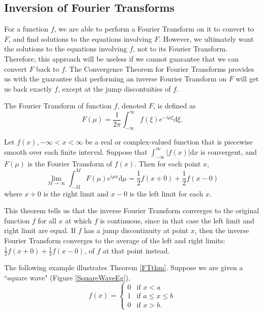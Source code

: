\subsection{Inversion of Fourier Transforms}
For a function $f$, we are able to perform a Fourier Transform on it to convert to $F$, and find solutions to the equations involving $F$.
However, we ultimately want the solutions to the equations involving $f$, not to its Fourier Transform.
Therefore, this approach will be useless if we cannot guarantee that we can convert $F$ back to $f$.
The Convergence Theorem for Fourier Transforms provides us with the guarantee that performing an inverse Fourier Transform on $F$ will get us back exactly $f$, except at the jump discontuities of $f$.

\begin{defn} \label{FTdefn}
The Fourier Transform of function $f$, denoted $F$, is defined as
$$F(\mu) = \frac{1}{2\pi}\int_{-\infty}^{\infty}f(\xi)e^{-i\mu\xi}\mathrm{d}\xi.$$
\end{defn}

\begin{thm} \label{FTthm}
Let $f(x), -\infty < x < \infty$ be a real or complex-valued function that is piecewise smooth over each finite interval. \pause Suppose that $\int_{-\infty}^{\infty}|f(x)|\mathrm{d}x$ is convergent, and $F(\mu)$ is the Fourier Transform of $f(x)$. \pause Then for each point $x$,
$$\lim_{M\rightarrow\infty}\int_{-M}^{M} F(\mu)e^{i\mu x}\mathrm{d}\mu = \frac{1}{2}f(x+0) + \frac{1}{2}f(x-0)$$
where $x+0$ is the right limit and $x-0$ is the left limit for each $x$.
\end{thm}

This theorem tells us that the inverse Fourier Transform converges to the original function $f$ for all $x$ at which $f$ is continuous, since in that case the left limit and right limit are equal. If $f$ has a jump discontinuity at point $x$, then the inverse Fourier Transform converges to the average of the left and right limits: $\frac{1}{2}f(x+0) + \frac{1}{2}f(x-0)$, of $f$ at that point instead.

The following example illustrates Theorem \ref{FTthm}. Suppose we are given a ``square wave" (Figure \ref{SquareWaveEg}),
$$f(x) = \begin{cases}
      \displaystyle 0 & \mbox{if }x < a \\
      1 & \mbox{if }a \leq x \leq b \\
      0 & \mbox{if }x > b.
   \end{cases}$$

